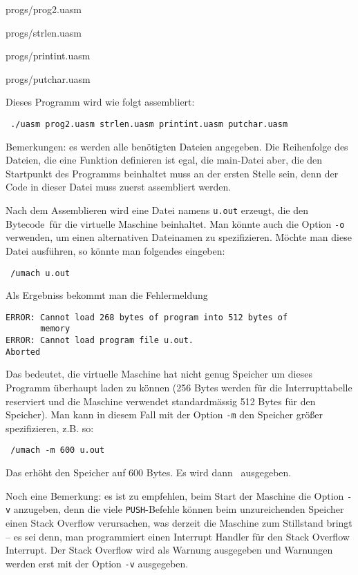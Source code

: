 
                {progs/prog2.uasm}



                {progs/strlen.uasm}



                {progs/printint.uasm}



                {progs/putchar.uasm}


Dieses Programm wird wie folgt assembliert:
\begin{lstlisting}
 ./uasm prog2.uasm strlen.uasm printint.uasm putchar.uasm
\end{lstlisting}
Bemerkungen: es werden alle benötigten Dateien angegeben. Die Reihenfolge des
Dateien, die eine Funktion definieren ist egal, die \glqq main\grqq-Datei aber,
die den Startpunkt des Programms beinhaltet muss an der ersten Stelle
sein, denn der Code in dieser Datei muss zuerst assembliert werden.

Nach dem Assemblieren wird eine Datei namens \texttt{u.out} erzeugt, die den
\glqq Bytecode\grqq\ für die virtuelle Maschine beinhaltet. Man könnte auch die
Option \texttt{-o} verwenden, um einen alternativen Dateinamen zu spezifizieren.
Möchte man diese Datei ausführen, so könnte man folgendes eingeben:
\begin{lstlisting}
 /umach u.out
\end{lstlisting}
Als Ergebniss bekommt man die Fehlermeldung
\begin{lstlisting}
ERROR: Cannot load 268 bytes of program into 512 bytes of
       memory
ERROR: Cannot load program file u.out.
Aborted
\end{lstlisting}
Das bedeutet, die virtuelle Maschine hat nicht genug Speicher um dieses
Programm überhaupt laden zu können (256 Bytes werden für die Interrupttabelle
reserviert und die Maschine verwendet standardmässig 512 Bytes für den
Speicher). Man kann in diesem Fall mit der Option \texttt{-m} den Speicher
größer spezifizieren, z.B. so:
\begin{lstlisting}
 /umach -m 600 u.out
\end{lstlisting}
Das erhöht den Speicher auf 600 Bytes. Es wird dann \grqq\ ausgegeben.

Noch eine Bemerkung: es ist zu empfehlen, beim Start der Maschine die Option
\texttt{-v} anzugeben, denn die viele \texttt{PUSH}-Befehle können beim
unzureichenden Speicher einen Stack Overflow verursachen, was derzeit die
Maschine zum Stillstand bringt -- es sei denn, man programmiert einen Interrupt
Handler für den Stack Overflow Interrupt. Der Stack Overflow wird als Warnung
ausgegeben und Warnungen werden erst mit der Option \texttt{-v} ausgegeben.








